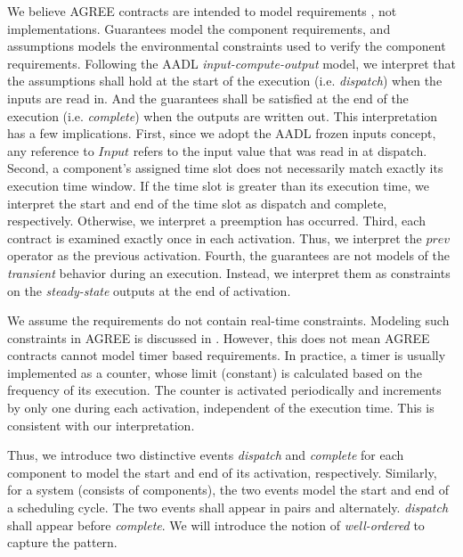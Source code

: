 We believe AGREE contracts are intended to model requirements \cite{AGREE2}, not implementations. Guarantees model the component requirements, and assumptions models the environmental constraints used to verify the component requirements. Following the AADL \emph{input-compute-output} model, we interpret that the assumptions shall hold at the start of the execution (i.e. \emph{dispatch}) when the inputs are read in. And the guarantees shall be satisfied at the end of the execution (i.e. \emph{complete}) when the outputs are written out. This interpretation has a few implications. 
First, since we adopt the AADL frozen inputs concept, any reference to $Input$ refers to the input value that was read in at dispatch.
Second, a component's assigned time slot does not necessarily match exactly its execution time window. If the time slot is greater than its execution time, we interpret the start and end of the time slot as dispatch and complete, respectively. Otherwise, we interpret a preemption has occurred.
Third, each contract is examined exactly once in each activation. Thus, we interpret the $prev$ operator as the previous activation. 
Fourth, the guarantees are not models of the \emph{transient} behavior during an execution. Instead, we interpret them as constraints on the \emph{steady-state} outputs at the end of activation.

We assume the requirements do not contain real-time constraints. Modeling such constraints in AGREE is discussed in \cite{rtAGREE}.
However, this does not mean AGREE contracts cannot model timer based requirements. In practice, a timer is usually implemented as a counter, whose limit (constant) is calculated based on the frequency of its execution. The counter is activated periodically and increments by only one during each activation, independent of the execution time. This is consistent with our interpretation.

Thus, we introduce two distinctive events \emph{dispatch} and \emph{complete} for each component to model the start and end of its activation, respectively. 
Similarly, for a system (consists of components), the two events model the start and end of a scheduling cycle. 
The two events shall appear in pairs and alternately. \emph{dispatch} shall appear before \emph{complete}. We will introduce the notion of \emph{well-ordered} to capture the pattern.

